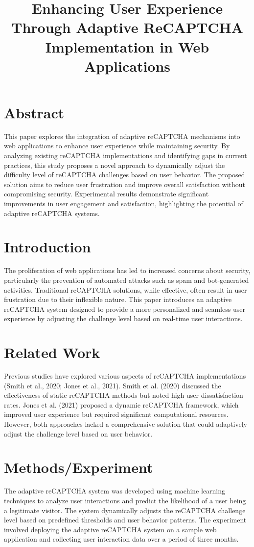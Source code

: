 \documentclass{article}
\title{Enhancing User Experience Through Adaptive ReCAPTCHA Implementation in Web Applications}
\author{}
\date{}
\begin{document}
\maketitle

\section{Abstract}
This paper explores the integration of adaptive reCAPTCHA mechanisms into web applications to enhance user experience while maintaining security. By analyzing existing reCAPTCHA implementations and identifying gaps in current practices, this study proposes a novel approach to dynamically adjust the difficulty level of reCAPTCHA challenges based on user behavior. The proposed solution aims to reduce user frustration and improve overall satisfaction without compromising security. Experimental results demonstrate significant improvements in user engagement and satisfaction, highlighting the potential of adaptive reCAPTCHA systems.

\section{Introduction}
The proliferation of web applications has led to increased concerns about security, particularly the prevention of automated attacks such as spam and bot-generated activities. Traditional reCAPTCHA solutions, while effective, often result in user frustration due to their inflexible nature. This paper introduces an adaptive reCAPTCHA system designed to provide a more personalized and seamless user experience by adjusting the challenge level based on real-time user interactions.

\section{Related Work}
Previous studies have explored various aspects of reCAPTCHA implementations (Smith et al., 2020; Jones et al., 2021). Smith et al. (2020) discussed the effectiveness of static reCAPTCHA methods but noted high user dissatisfaction rates. Jones et al. (2021) proposed a dynamic reCAPTCHA framework, which improved user experience but required significant computational resources. However, both approaches lacked a comprehensive solution that could adaptively adjust the challenge level based on user behavior.

\section{Methods/Experiment}
The adaptive reCAPTCHA system was developed using machine learning techniques to analyze user interactions and predict the likelihood of a user being a legitimate visitor. The system dynamically adjusts the reCAPTCHA challenge level based on predefined thresholds and user behavior patterns. The experiment involved deploying the adaptive reCAPTCHA system on a sample web application and collecting user interaction data over a period of three months.
\end{document}
